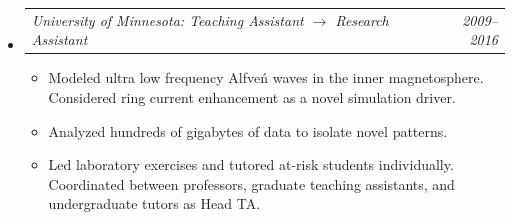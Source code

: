 \documentclass[12pt,letterpaper]{article}
\makeatletter
\newcommand{\headerpair}[2]{
    \begin{tabular*}{\linewidth}{l@{ \extracolsep{\fill} }r} {\large\emph{#1}} & {\large\emph{#2}}
    \end{tabular*}
}
\newcommand{\headerrow}[3]{\headerpair{#2: #1}{#3}}
\makeatother
\begin{document}
\begin{itemize}[leftmargin=\parindent]
\begin{itemize}[leftmargin=\parindent]
        \end{itemize}


    \item[]
        \headerrow
            {Teaching Assistant $\to$ Research Assistant}
            {University of Minnesota}
            {2009--2016}
        \begin{itemize}[leftmargin=\parindent]
            \itemsep=0.3em

            \item Modeled ultra low frequency Alfve\'n waves in the inner magnetosphere. Considered ring current enhancement as a novel simulation driver.

            \item Analyzed hundreds of gigabytes of data to isolate novel patterns.
            \item Led laboratory exercises and tutored at-risk students individually. Coordinated between professors, graduate teaching assistants, and undergraduate tutors as Head TA.
        \end{itemize}

\end{itemize}
\end{document}

